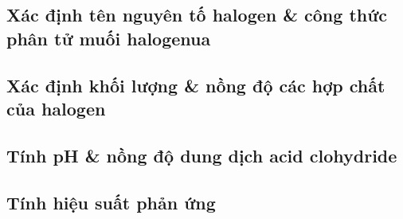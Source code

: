 \documentclass{article}
\numberwithin{equation}{section}
\begin{document}
\subsection{Xác định tên nguyên tố halogen \& công thức phân tử muối halogenua}


\subsection{Xác định khối lượng \& nồng độ các hợp chất của halogen}


\subsection{Tính pH \& nồng độ dung dịch acid clohydride}


\subsection{Tính hiệu suất phản ứng}


\printbibliography[heading=bibintoc]
	
\end{document}
